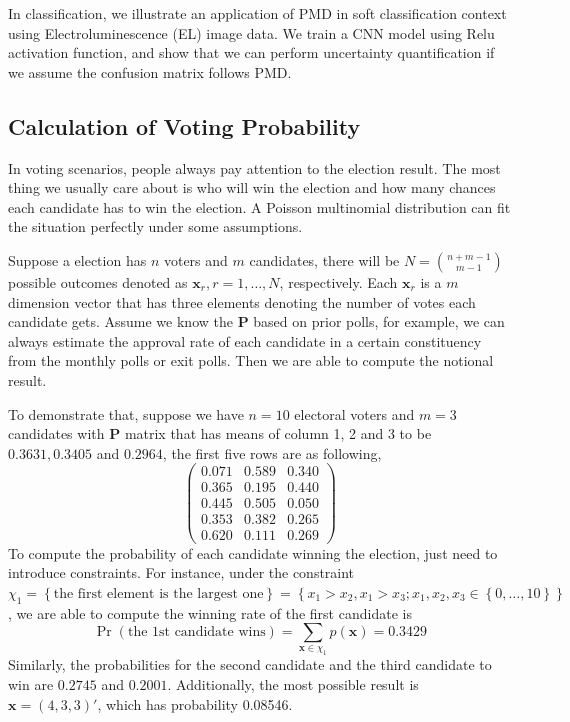 \documentclass[12pt]{article}
\newcommand{\Pmat}{\mathbf{P}}
\newcommand{\PMD}{\textrm{PMD}}
\newcommand{\xvec}{\boldsymbol{x}}
\begin{document}
In classification, we illustrate an application of $\PMD$ in soft classification context using Electroluminescence (EL) image data. We train a CNN model using Relu activation function, and show that we can perform uncertainty quantification if we assume the confusion matrix follows $\PMD$.


\subsection{Calculation of Voting Probability}
In voting scenarios, people always pay attention to the election result. The most thing we usually care about is who will win the election and how many chances each candidate has to win the election. A Poisson multinomial distribution can fit the situation perfectly under some assumptions.

Suppose a election has $n$ voters and $m$ candidates, there will be $N = \binom{n+m-1}{m-1}$ possible outcomes denoted as $\xvec_r, r = 1, \dots, N$, respectively. Each $\xvec_r$ is a $m$ dimension vector that has three elements denoting the number of votes each candidate gets. Assume we know the $\Pmat$ based on prior polls, for example, we can always estimate the approval rate of each candidate in a certain constituency from the monthly polls or exit polls. Then we are able to compute the notional result.

To demonstrate that, suppose we have $n=10$ electoral voters and $m=3$ candidates with $\Pmat$ matrix that has means of column 1, 2 and 3 to be $0.3631,0.3405$ and $0.2964$, the first five rows are as following,
\begin{equation*}
\begin{pmatrix}
0.071 & 0.589 & 0.340\\
0.365 & 0.195 & 0.440\\
0.445 & 0.505 & 0.050\\
0.353 & 0.382 & 0.265\\
0.620 & 0.111 & 0.269
    \end{pmatrix}
\end{equation*}
To compute the probability of each candidate winning the election, just need to introduce constraints. For instance, under the constraint $\chi_1 = \left\{\text{the first element is the largest one}\right\} = \left\{x_1>x_2, x_1>x_3; x_1, x_2,x_3 \in \left\{0,\dots,10\right\}\right\}$, we are able to compute the winning rate of the first candidate is
\begin{equation*}
\Pr(\text{the 1st candidate wins}) = \sum_{\xvec \in \chi_{1}} p(\xvec) = 0.3429
\end{equation*}
Similarly, the probabilities for the second candidate and the third candidate to win are $0.2745$ and $0.2001$. Additionally, the most possible result is $\xvec=(4,3,3)'$, which has probability 0.08546.
\end{document}
